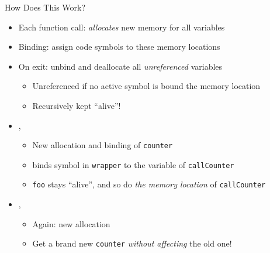
\begin{frame}{How Does This Work?}
%
\begin{itemize}
\item Each function call: \emph{allocates} new memory for all variables
\item Binding: assign code symbols to these memory locations
\item On exit: unbind and deallocate all \emph{unreferenced} variables
	\begin{itemize}
	\item Unreferenced if no active symbol is bound the memory location
	\item Recursively kept \enquote{alive}!
	\end{itemize}
\item {}, 
	\begin{itemize}
	\item New allocation and binding of \texttt{counter}
	\item {} binds symbol in \texttt{wrapper} to the variable of \texttt{callCounter}
	\item \texttt{foo} stays \enquote{alive}, and so do \emph{the memory location} of \texttt{callCounter}
	\end{itemize}
\item {}, 
	\begin{itemize}
	\item Again: new allocation
	\item Get a brand new \texttt{counter} \emph{without affecting} the old one!
	\end{itemize}
\end{itemize}
%
\end{frame}


